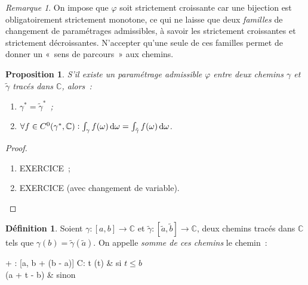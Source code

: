\documentclass{report}
\newtheorem{prp}[thm]{Proposition}
\theoremstyle{definition}
\newtheorem{déf}[thm]{Définition}
\theoremstyle{remark}
\newtheorem*{rmq}{Remarque}
\numberwithin{equation}{section}
\newcommand{\C}{\mathbb C}
\begin{document}
			\begin{rmq} On impose que $\varphi$ soit strictement croissante car une bijection est obligatoirement strictement monotone, ce qui ne laisse que deux
			\textit{familles} de changement de paramétrages admissibles, à savoir les strictement croissantes et strictement décroissantes. N'accepter qu'une
			seule de ces familles permet de donner un «~sens de parcours~» aux chemins.
			\end{rmq}

			\begin{prp} S'il existe un paramétrage admissible $\varphi$ entre deux chemins $\gamma$ et $\tilde \gamma$ tracés dans $\C$, alors~:
			\begin{enumerate}
				\item $\gamma^* = \tilde\gamma^*$~;
				\item $\forall f \in C^0(\gamma^*, \C) : \int_\gamma f(\omega)\dif \omega = \int_{\tilde \gamma} f(\omega)\dif \omega$.
			\end{enumerate}
			\end{prp}

			\begin{proof}~
			\begin{enumerate}
				\item EXERCICE~;
				\item EXERCICE (avec changement de variable).
			\end{enumerate}
			\end{proof}

			\begin{déf} Soient $\gamma : [a, b] \to \C$ et $\tilde \gamma : [\tilde a, \tilde b] \to \C$, deux chemins tracés dans $\C$ tels que
			$\gamma(b) = \tilde \gamma(\tilde a)$. On appelle \textit{somme de ces chemins} le chemin~:
			\begin{subnumcases}
				{\gamma + \tilde \gamma : [a, b + (\tilde b - \tilde a)] \to \C : t \mapsto}
					\gamma(t) & si $t \leq b$ \\
					\tilde \gamma(\tilde a + t - b) & sinon
			\end{subnumcases}
			\end{déf}
\end{document}
